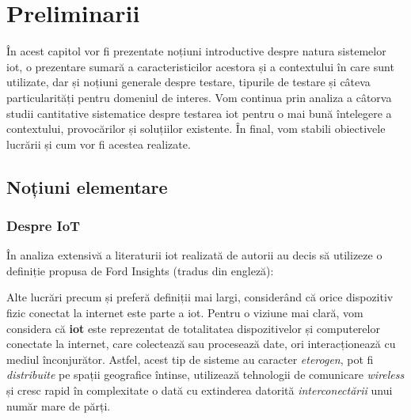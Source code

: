 \chapter{Preliminarii}

În acest capitol vor fi prezentate noțiuni introductive despre natura sistemelor \acrfull{iot}, o prezentare sumară a caracteristicilor acestora și a contextului în care sunt utilizate, dar și noțiuni generale despre testare, tipurile de testare și câteva particularități pentru domeniul de interes. Vom continua prin analiza a câtorva studii cantitative sistematice despre testarea \acrshort{iot} pentru o mai bună întelegere a contextului, provocărilor și soluțiilor existente. În final, vom stabili obiectivele lucrării și cum vor fi acestea realizate.

\section{Noțiuni elementare}

\subsection*{Despre IoT}


În analiza extensivă a literaturii \acrshort{iot} realizată de \citet{Nord2019} autorii au decis să utilizeze o definiție propusa de Ford Insights \citet{insight2017internet} (tradus din engleză):



Alte lucrări precum \citet{Lee2015} și \citet{Huang2015} preferă definiții mai largi, considerând că orice dispozitiv fizic conectat la internet este parte a \acrshort{iot}. Pentru o viziune mai clară, vom considera că \textbf{\acrshort{iot}} este reprezentat de totalitatea dispozitivelor și computerelor conectate la internet, care colectează sau procesează date, ori interacționează cu mediul înconjurător. Astfel, acest tip de sisteme au caracter \emph{eterogen}, pot fi \emph{distribuite} pe spații geografice întinse, utilizează tehnologii de comunicare \emph{wireless} și cresc rapid în complexitate o dată cu extinderea datorită \emph{interconectării} unui număr mare de părți.

